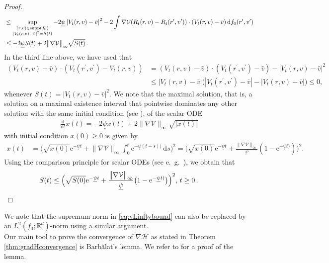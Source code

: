 \documentclass[11pt]{article}
\newcommand{\R}[0]{\mathbb R}
\newcommand{\dx}[1]{\frac{\mathrm{d}}{\mathrm{d}#1}}
\newcommand{\abs}[1]{\left| #1 \right|}
\newcommand{\supp}{\mathrm{supp}}
\newcommand{\msolinit}[1]{f_0(#1)}
\newcommand{\charX}[2]{R_{#1}(#2) }
\newcommand{\charV}[2]{V_{#1}(#2)}
\begin{document}
\begin{bibunit}[unsrtnat]
\begin{proof}
\begin{align*}
				&\leq  \sup\limits_{\substack{(r,v) \in \supp (f_0) \\
						\abs{ \charV{t}{r,v}  - \bar{v} }^{2} = S(t)}  } - 2\underline{\psi} \abs{ \charV{t}{r,v}  - \bar{v}}^{2} - 2\int \vspace{-0.2em} \nabla \mathcal{V}( \charX{t}{r,v} - \charX{t}{r^\prime, v^\prime} ) \cdot ( \charV{t}{r,v} - \bar{v}) \, \mathrm{d}\msolinit{r^\prime, v^\prime}  \\
				&\leq - 2\underline{\psi} S(t) + 2\big\| \nabla \mathcal{V} \big\|_{\infty} \sqrt{S(t)} \, .
			\end{align*}
	In the third line above, we have used that 
    \begin{align*}
        (\charV{t}{r,v}  - \bar{v}) \cdot (\charV{t}{r^\prime, v^\prime} -  \charV{t}{r,v} ) 
        &= (\charV{t}{r,v}  - \bar{v}) \cdot (\charV{t}{r^\prime,v^\prime}  - \bar{v}) - \abs{\charV{t}{r,v}  - \bar{v}}^2 \\
        &\leq \abs{\charV{t}{r,v}  - \bar{v}} \big( \abs{ \charV{t}{r^\prime, v^\prime} - \bar{v} } - \abs{\charV{t}{r, v} - \bar{v}} \big)
        \leq 0 ,
    \end{align*}
    whenever $S(t) = \abs{\charV{t}{r, v} - \bar{v}}^2$. 
    We note that the maximal solution, that is, a solution on a maximal existence interval that pointwise dominates any other solution with the same initial condition (see \cite[Chapter 3.2]{Hartmann}), of the scalar ODE 
	\begin{align*}
		\dx{t} x(t) = - 2 \underline{\psi} x(t) + 2\big\| \nabla \mathcal{V} \big\|_{\infty} \sqrt{\abs{x(t)}}
	\end{align*}
	with initial condition $x(0) \geq 0$ is given by 
	\begin{align*}
		x(t) &= \Big( \sqrt{x(0)} \mathrm{e}^{-\underline{\psi} t} + \big\| \nabla \mathcal{V} \big\|_{\infty} \int_0^t \mathrm{e}^{-\underline{\psi} (t-s))} \, \mathrm{d}s \Big)^{2} 
		= \Big( \sqrt{x(0)} \mathrm{e}^{-\underline{\psi} t} + \frac{\big\| \nabla \mathcal{V} \big\|_{\infty}}{\underline{\psi}} (1- \mathrm{e}^{-\underline{\psi} t)} ) \Big)^{2} .
	\end{align*}
	Using the comparison principle for scalar ODEs (see e.\ g.\ \cite[Theorem $4.1$, Chapter $3$]{Hartmann}), we obtain that
	\begin{align*}
		S(t) &\leq
		\Big( \sqrt{S(0)} \mathrm{e}^{- \underline{\psi} t} + \frac{\big\| \nabla \mathcal{V} \big\|_{\infty}}{\underline{\psi}} \big( 1 - \mathrm{e}^{-\underline{\psi} t)} \big) \Big)^{2} 
		 , \,  t \geq 0 \, . \qquad \qedhere
	\end{align*}
\end{proof}
We note that the supremum norm in \eqref{eq:vLinftybound} can also be replaced by an $L^2(f_0;\R^d)$-norm using a similar argument. \\
Our main tool to prove the convergence of $\nabla \mathcal{H}$ as stated in Theorem \ref{thm:gradHconvergence} is {B}arb\u alat's lemma.  We refer to \cite[Theorem $4$]{FarkasWegner} for a proof of the lemma.


\end{bibunit}
\end{document}
